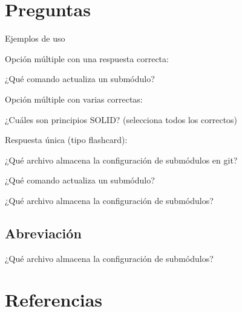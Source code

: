 \section{Preguntas}

Ejemplos de uso

Opción múltiple con una respuesta correcta:

\begin{nkQuestion}{¿Qué comando actualiza un submódulo?}
\end{nkQuestion}

Opción múltiple con varias correctas:

\begin{nkQuestion}{¿Cuáles son principios SOLID? (selecciona todos los correctos)}
\end{nkQuestion}

Respuesta única (tipo flashcard):

\begin{nkQuestion}{¿Qué archivo almacena la configuración de submódulos en git?}
\end{nkQuestion}


\begin{nkQuestion}{¿Qué comando actualiza un submódulo?}
\end{nkQuestion}

\begin{nkQuestion}[open]{¿Qué archivo almacena la configuración de submódulos?}
\end{nkQuestion}

    \subsection{Abreviación}
    
    \begin{nkQuestion}[open]{¿Qué archivo almacena la configuración de submódulos?}
    \end{nkQuestion}
    
    
\section{Referencias}


\begin{itemize}
\end{itemize}

